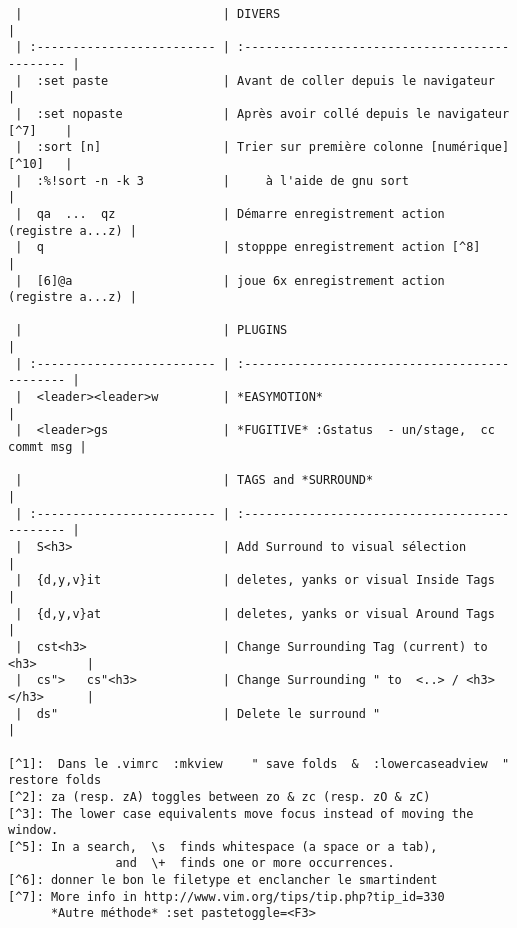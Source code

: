 \documentclass[10pt,landscape]{article}
\begin{document}
\begin{multicols}{2}
\begin{verbatim}
 |                            | DIVERS                                         |
 | :------------------------- | :--------------------------------------------- |
 |  :set paste                | Avant de coller depuis le navigateur           |
 |  :set nopaste              | Après avoir collé depuis le navigateur [^7]    |
 |  :sort [n]                 | Trier sur première colonne [numérique] [^10]   |
 |  :%!sort -n -k 3           |     à l'aide de gnu sort                       |
 |  qa  ...  qz               | Démarre enregistrement action (registre a...z) |
 |  q                         | stopppe enregistrement action [^8]             |
 |  [6]@a                     | joue 6x enregistrement action (registre a...z) |

 |                            | PLUGINS                                        |
 | :------------------------- | :--------------------------------------------- |
 |  <leader><leader>w         | *EASYMOTION*                                   |
 |  <leader>gs                | *FUGITIVE* :Gstatus  - un/stage,  cc commt msg |

 |                            | TAGS and *SURROUND*                            |
 | :------------------------- | :--------------------------------------------- |
 |  S<h3>                     | Add Surround to visual sélection               |
 |  {d,y,v}it                 | deletes, yanks or visual Inside Tags           |
 |  {d,y,v}at                 | deletes, yanks or visual Around Tags           |
 |  cst<h3>                   | Change Surrounding Tag (current) to <h3>       |
 |  cs">   cs"<h3>            | Change Surrounding " to  <..> / <h3></h3>      |
 |  ds"                       | Delete le surround "                           |

[^1]:  Dans le .vimrc  :mkview    " save folds  &  :lowercaseadview  " restore folds 
[^2]: za (resp. zA) toggles between zo & zc (resp. zO & zC)
[^3]: The lower case equivalents move focus instead of moving the window.
[^5]: In a search,  \s  finds whitespace (a space or a tab), 
               and  \+  finds one or more occurrences.
[^6]: donner le bon le filetype et enclancher le smartindent
[^7]: More info in http://www.vim.org/tips/tip.php?tip_id=330 
      *Autre méthode* :set pastetoggle=<F3>
\end{verbatim}
\end{multicols}
\end{document}
